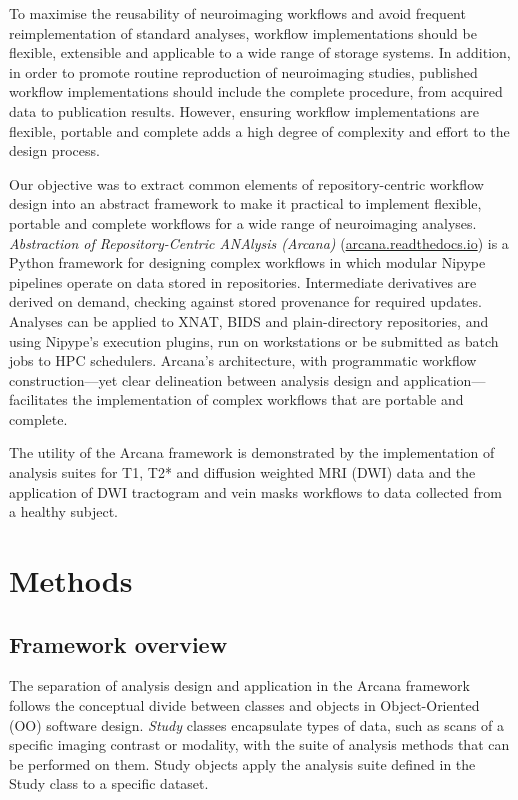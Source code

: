 \documentclass[smallextended]{svjour3}       %
\begin{document}
To maximise the reusability of neuroimaging workflows and avoid frequent
reimplementation of standard analyses, workflow implementations should
be flexible, extensible and applicable to a wide range of storage
systems. In addition, in order to promote routine reproduction of
neuroimaging studies, published workflow implementations should include
the complete procedure, from acquired data to publication results.
However, ensuring workflow implementations are flexible, portable and
complete adds a high degree of complexity and effort to the design
process.

Our objective was to extract common elements of repository-centric
workflow design into an abstract framework to make it practical to
implement flexible, portable and complete workflows for a wide range of
neuroimaging analyses. \emph{Abstraction of Repository-Centric ANAlysis
(Arcana)} (\url{arcana.readthedocs.io}) is a Python framework for
designing complex workflows in which modular Nipype pipelines operate on
data stored in repositories. Intermediate derivatives are
derived on demand, checking against stored provenance for required
updates. Analyses can be applied to XNAT, BIDS and plain-directory
repositories, and using Nipype's execution plugins, run on workstations
or be submitted as batch jobs to HPC schedulers. Arcana's architecture,
with programmatic workflow construction---yet clear delineation between
analysis design and application---facilitates the implementation of
complex workflows that are portable and complete.

The utility of the Arcana framework is demonstrated by the
implementation of analysis suites for T1, T2* and diffusion weighted MRI
(DWI) data and the application of DWI tractogram \citep{tournier_mrtrix:_2012} and
vein masks \citep{ward_vein_2017} workflows to data collected from a
healthy subject.

\section*{Methods}
\label{methods}

\subsection*{Framework overview}
\label{framework-overview}

The separation of analysis design and application in the Arcana
framework follows the conceptual divide between classes and objects in
Object-Oriented (OO) software design. \emph{Study} classes encapsulate
types of data, such as scans of a specific imaging
contrast or modality, with the suite of analysis methods that can be performed on
them. Study objects apply the analysis suite defined in
the Study class to a specific dataset.
\end{document}
